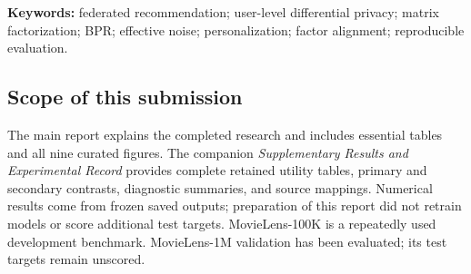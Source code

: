 \medskip
\noindent\textbf{Keywords:} federated recommendation; user-level differential privacy;
matrix factorization; BPR; effective noise; personalization; factor alignment;
reproducible evaluation.

\subsection*{Scope of this submission}
The main report explains the completed research and includes essential tables and
all nine curated figures. The companion \emph{Supplementary Results and Experimental
Record} provides complete retained utility tables, primary and secondary contrasts,
diagnostic summaries, and source mappings. Numerical results come from frozen saved
outputs; preparation of this report did not retrain models or score additional test
targets. MovieLens-100K is a repeatedly used development benchmark. MovieLens-1M
validation has been evaluated; its test targets remain unscored.
